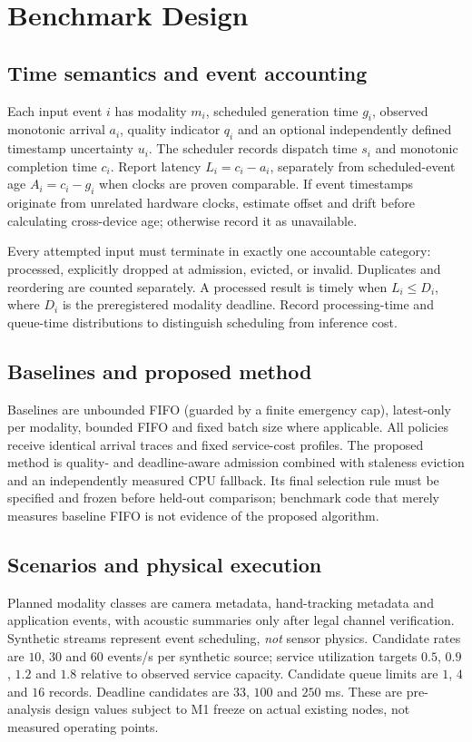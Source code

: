 \section{Benchmark Design}
\subsection{Time semantics and event accounting}
Each input event $i$ has modality $m_i$, scheduled generation time $g_i$, observed monotonic arrival $a_i$, quality indicator $q_i$ and an optional independently defined timestamp uncertainty $u_i$. The scheduler records dispatch time $s_i$ and monotonic completion time $c_i$. Report latency $L_i=c_i-a_i$, separately from scheduled-event age $A_i=c_i-g_i$ when clocks are proven comparable. If event timestamps originate from unrelated hardware clocks, estimate offset and drift before calculating cross-device age; otherwise record it as unavailable.

Every attempted input must terminate in exactly one accountable category: processed, explicitly dropped at admission, evicted, or invalid. Duplicates and reordering are counted separately. A processed result is timely when $L_i \le D_i$, where $D_i$ is the preregistered modality deadline. Record processing-time and queue-time distributions to distinguish scheduling from inference cost.

\subsection{Baselines and proposed method}
Baselines are unbounded FIFO (guarded by a finite emergency cap), latest-only per modality, bounded FIFO and fixed batch size where applicable. All policies receive identical arrival traces and fixed service-cost profiles. The proposed method is quality- and deadline-aware admission combined with staleness eviction and an independently measured CPU fallback. Its final selection rule must be specified and frozen before held-out comparison; benchmark code that merely measures baseline FIFO is not evidence of the proposed algorithm.

\subsection{Scenarios and physical execution}
Planned modality classes are camera metadata, hand-tracking metadata and application events, with acoustic summaries only after legal channel verification. Synthetic streams represent event scheduling, \emph{not} sensor physics. Candidate rates are $10$, $30$ and $60$ events/s per synthetic source; service utilization targets $0.5$, $0.9$, $1.2$ and $1.8$ relative to observed service capacity. Candidate queue limits are $1$, $4$ and $16$ records. Deadline candidates are $33$, $100$ and $250$ ms. These are pre-analysis design values subject to M1 freeze on actual existing nodes, not measured operating points.

